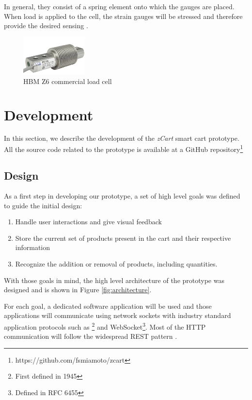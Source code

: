 \documentclass[openright]{normas-utf-tex} %
\begin{document}
In general, they consist of a spring element onto which the gauges are placed.
When load is applied to the cell, the strain gauges will be stressed and
therefore provide the desired sensing \cite{HBM2022}.

\begin{figure}[H]
	\centering
	\includegraphics[width=0.3\textwidth]{./images/hbmz6.png}
	\caption[HBM Z6 commercial load cell]{HBM Z6 commercial load cell}
	\label{fig:gauge2}
\end{figure}

\chapter{Development}
\label{chap:desenv}

In this section, we describe the development of the \textit{zCart} smart cart
prototype. All the source code related to the prototype is available at a
GitHub repository\footnote{https://github.com/fsmiamoto/zcart}

\section{Design}
\label{sec:design}

As a first step in developing our prototype, a set of
high level goals was defined to guide the initial design:

\begin{enumerate}
    \item Handle user interactions and give visual feedback
    \item Store the current set of products present in the cart and their respective information
    \item Recognize the addition or removal of products, including quantities.
\end{enumerate}

With those goals in mind, the high level architecture of the prototype
was designed and is shown in Figure \ref{fig:architecture}.

For each goal, a dedicated software application will be used and those
applications will communicate using 
network sockets \cite{Kurose2013} with industry standard application protocols such as
\footnote{First defined in
 1945} and WebSocket\footnote{Defined in RFC 6455}.
Most of the HTTP communication will follow the widespread REST pattern \cite{Roy2000}.
\end{document}
